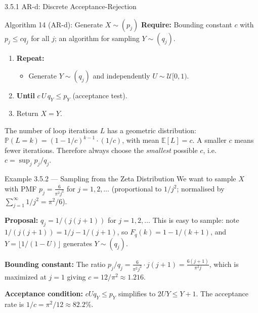 \documentclass[aspectratio=169,10pt]{beamer}
\newcommand{\PP}{\mathbb{P}}
\newcommand{\EE}{\mathbb{E}}
\newcommand{\UU}{\mathcal{U}}
\begin{document}
\begin{frame}[allowframebreaks]{3.5.1 AR-d: Discrete Acceptance-Rejection}
\framebreak

\begin{alertblock}{Algorithm 14 (AR-d): Generate $X \sim (p_j)$}
  \textbf{Require:} Bounding constant $c$ with $p_j \le c q_j$ for all $j$;
  an algorithm for sampling $Y \sim (q_j)$.
  \begin{enumerate}
    \item \textbf{Repeat:}
    \begin{itemize}
      \item Generate $Y \sim (q_j)$ and independently $U \sim \UU[0,1)$.
    \end{itemize}
    \item \textbf{Until} $c \, U \, q_Y \le p_Y$ (acceptance test).
    \item Return $X = Y$.
  \end{enumerate}
  The number of loop iterations $L$ has a geometric distribution:
  $\PP(L = k) = (1 - 1/c)^{k-1} \cdot (1/c)$, with mean $\EE[L] = c$.
  A smaller $c$ means fewer iterations.  Therefore always choose the
  \emph{smallest} possible $c$, i.e.\ $c = \sup_j p_j/q_j$.
\end{alertblock}

\begin{exampleblock}{Example 3.5.2 --- Sampling from the Zeta Distribution}
  We want to sample $X$ with PMF $p_j = \frac{6}{\pi^2 j^2}$ for $j = 1, 2, \ldots$
  (proportional to $1/j^2$; normalised by $\sum_{j=1}^\infty 1/j^2 = \pi^2/6$).

  \textbf{Proposal:} $q_j = 1/(j(j+1))$ for $j = 1, 2, \ldots$  This is easy to sample:
  note $1/(j(j+1)) = 1/j - 1/(j+1)$, so $F_q(k) = 1 - 1/(k+1)$,
  and $Y = \lfloor 1/(1-U) \rfloor$ generates $Y \sim (q_j)$.

  \textbf{Bounding constant:} The ratio $p_j/q_j = \frac{6}{\pi^2 j^2} \cdot j(j+1)
  = \frac{6(j+1)}{\pi^2 j}$, which is maximized at $j = 1$ giving $c = 12/\pi^2 \approx 1.216$.

  \textbf{Acceptance condition:} $c U q_Y \le p_Y$ simplifies to $2UY \le Y + 1$.
  The acceptance rate is $1/c = \pi^2/12 \approx 82.2\%$.
\end{exampleblock}

\end{frame}
\end{document}
